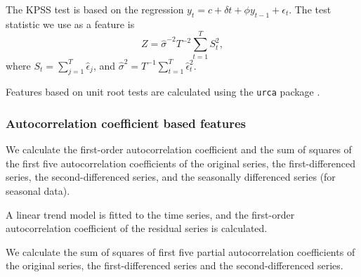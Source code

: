 \documentclass[11pt,a4paper,]{article}
\theoremstyle{definition}
\theoremstyle{definition}
\theoremstyle{definition}
\theoremstyle{remark}
\begin{document}
The KPSS test is based on the regression
\(y_t=c+\delta t+\phi y_{t-1}+\epsilon_t\). The test statistic we use as
a feature is \[
  Z= \hat{\sigma}^{-2} T^{-2}\sum_{t=1}^{T}S_t^2,
\] where \(S_t=\sum_{j=1}^T\hat{\epsilon}_j\), and
\(\hat{\sigma}^2 = T^{-1}\sum_{t=1}^{T} \hat\epsilon_t^2\).

Features based on unit root tests are calculated using the \texttt{urca}
package \autocite{pfaff2016package}.

\subsubsection*{Autocorrelation coefficient based
features}\label{autocorrelation-coefficient-based-features}

We calculate the first-order autocorrelation coefficient and the sum of
squares of the first five autocorrelation coefficients of the original
series, the first-differenced series, the second-differenced series, and
the seasonally differenced series (for seasonal data).

A linear trend model is fitted to the time series, and the first-order
autocorrelation coefficient of the residual series is calculated.

We calculate the sum of squares of first five partial autocorrelation
coefficients of the original series, the first-differenced series and
the second-differenced series.

\clearpage

\clearpage

\clearpage

\printbibliography[title=References]
\end{document}
